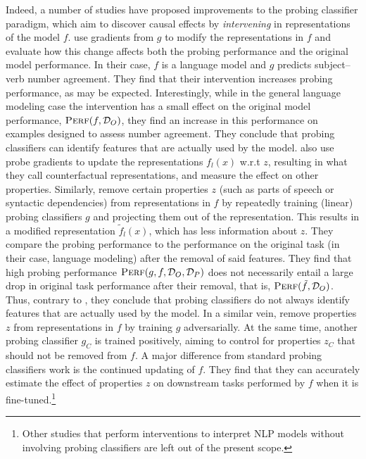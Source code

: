 \documentclass[discussion]{clv3}
\begin{document}
Indeed, a number of studies have proposed improvements to the probing classifier paradigm, which aim to discover causal effects by \emph{intervening} in representations of the model $f$. 
\citet{giulianelli-etal-2018-hood} use gradients from $g$ to modify the representations in $f$ and evaluate how this change affects both the probing performance and the original model performance. In their case, $f$ is a language model and $g$ predicts subject--verb number agreement. They find that their intervention increases probing performance, as may be expected. Interestingly, while in the general language modeling case the intervention has a small effect on the original model performance, $\textsc{Perf}(f, \mathcal{D}_O)$, they find an increase in this performance on examples designed to assess number agreement. They conclude that probing classifiers can identify features that are actually used by the model. 
\citet{tucker2021modified} also use probe gradients to update the representations $f_l(x)$ w.r.t $z$, resulting in what they call counterfactual representations, and measure the effect on other properties. 
Similarly, \citet{elazar2020amnesic} remove certain properties $z$ (such as parts of speech or syntactic dependencies) from representations in $f$ by repeatedly training (linear) probing classifiers $g$ and projecting them out of the representation. This results in a modified representation $\tilde{f}_l(x)$, which has less information about $z$.  They compare the probing performance to the performance on the original task (in their case, language modeling) after the removal of said features. They find that high probing performance $\textsc{Perf}(g, f, \mathcal{D}_O, \mathcal{D}_P)$ does not necessarily entail a large drop in original task performance after their removal, that is, $\textsc{Perf}(\tilde{f}, \mathcal{D}_O)$. Thus, contrary to \citet{giulianelli-etal-2018-hood}, they conclude that probing classifiers do not always identify features that are actually used by the model. 
In a similar vein, \citet{feder2020causalm} remove properties $z$ from representations in $f$ by training $g$ adversarially. 
At the same time, another probing classifier $g_C$ is trained positively, aiming to control for properties $z_C$ that should not be removed from $f$. A major difference from standard probing classifiers work is the continued updating of $f$. They find that they can accurately estimate the effect of properties $z$ on downstream tasks performed by $f$ when it is fine-tuned.\footnote{Other studies that perform interventions to interpret NLP models without involving probing classifiers \cite[e.g.,][]{bau2018identifying,lakretz-etal-2019-emergence,vig:2020:neurips} are left out of the present scope.}
\end{document}
